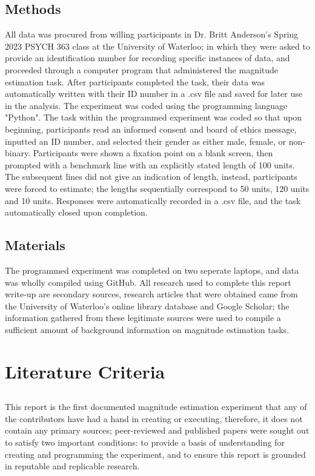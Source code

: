 \documentclass[11pt]{article}
\begin{document}
\subsection{Methods}
\label{sec:org5f9cdd5}
All data was procured from willing participants in Dr. Britt Anderson's Spring 2023 PSYCH 363 class at the University of Waterloo; in which they were asked to provide an identification number for recording specific instances of data, and proceeded through a computer program that administered the magnitude estimation task. After participants completed the task, their data was automatically written with their ID number in a .csv file and saved for later use in the analysis. The experiment was coded using the programming language "Python".
  The task within the programmed experiment was coded so that upon beginning, participants read an informed consent and board of ethics message, inputted an ID number, and selected their gender as either male, female, or non-binary. Participants were shown a fixation point on a blank screen, then prompted with a benchmark line with an explicitly stated length of 100 units. The subsequent lines did not give an indication of length, instead, participants were forced to estimate; the lengths sequentially correspond to 50 units, 120 units and 10 units. Responses were automatically recorded in a .csv file, and the task automatically closed upon completion.

\subsection{Materials}
\label{sec:orgd83742a}
The programmed experiment was completed on two seperate laptops, and data was wholly compiled using GitHub.
All research used to complete this report write-up are secondary sources, research articles that were obtained came from the University of Waterloo’s online library database and Google Scholar; the information gathered from these legitimate sources were used to compile a sufficient amount of background information on magnitude estimation tasks.

\section{Literature Criteria}
\label{sec:org4726719}
\subsection{}
\label{sec:orgfd4e3c3}
This report is the first documented magnitude estimation experiment that any of the contributors have had a hand in creating or executing, therefore, it does not contain any primary sources; peer-reviewed and published papers were sought out to satisfy two important conditions: to provide a basis of understanding for creating and programming the experiment, and to ensure this report is grounded in reputable and replicable research.
\end{document}
